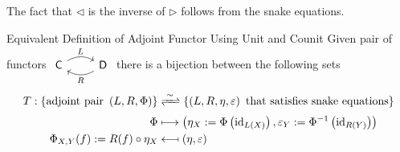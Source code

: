 \begin{center}
\end{center}
The fact that $\triangleleft$ is the inverse of $\triangleright$ follows from the snake equations.


\begin{proposition}{Equivalent Definition of Adjoint Functor Using Unit and Counit}{}
    Given pair of functors $\begin{tikzcd}[ampersand replacement=\&]
        \mathsf{C} \arrow[r, "L", bend left] \& \mathsf{D} \arrow[l, "R", bend left]
        \end{tikzcd}$
    there is a bijection between the following sets 
    \begin{align*}
        T:\left\{\text{adjoint pair }\left(L,R,\Phi\right)\right\}&\xrightleftharpoons{\;\sim\;}\left\{\left(L,R,\eta,\varepsilon\right)\text{ that satisfies snake equations}\right\}\\
        \Phi&\longmapsto\left(\eta_X:=\Phi\left(\mathrm{id}_{L(X)}\right), \varepsilon_Y:=\Phi^{-1}\left(\mathrm{id}_{R(Y)}\right)\right)\\
        \Phi_{X,Y}(f):=R(f) \circ \eta_X&\longmapsfrom(\eta, \varepsilon)
    \end{align*}
\end{proposition}

